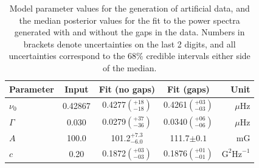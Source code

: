 \begin{table}[ht!]
	\begin{center}
		\caption{Model parameter values for the generation of artificial data, and the median posterior values for the fit to the power spectra generated with and without the gaps in the data. Numbers in brackets denote uncertainties on the last 2 digits, and all uncertainties correspond to the $68 \%$ credible intervals either side of the median.}
		\label{tab:fake_1pk_params}
		\begin{tabular}{l c c c r}
			\hline
			{\bf Parameter} & {\bf Input} & {\bf Fit (no gaps)} & {\bf Fit (gaps)} & {\bf Unit} \\
			\hline
			
			{$\nu_0$} & {0.42867} & {0.4277$\left(_{-18}^{+18}\right)$} & {0.4261$\left(_{-03}^{+03}\right)$} & {$\mu\mathrm{Hz} $}\\
			
			{$\Gamma$} & {0.030} & {0.0279$\left(_{-36}^{+37}\right)$} & {0.0340$\left(_{-06}^{+06}\right)$} & {$\mu\mathrm{Hz} $} \\
			
			{$A$} & {100.0} & {101.2$_{-6.0}^{+7.3}$} & {111.7$\pm 0.1$} & {$\mathrm{mG}$} \\
			
			{$c$} & {0.20} & {0.1872$\left(_{-03}^{+03}\right)$} & {0.1876$\left(_{-01}^{+01}\right)$} & {$\mathrm{G}^2\mathrm{Hz}^{-1}$} \\	
			
			\hline
		\end{tabular}
	\end{center}
\end{table}


